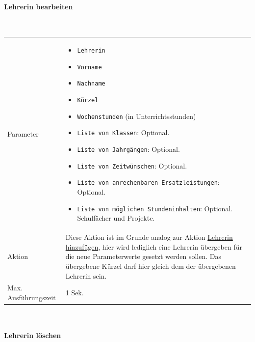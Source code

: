 \documentclass[fontsize=12pt,paper=a4,twoside]{scrartcl}
\begin{document}
\paragraph{Lehrerin bearbeiten}\mbox{}\\

\begin{tabularx}{\textwidth}{p{4cm}X}
Parameter & \begin{itemize}[itemsep=0pt, leftmargin = 0.5cm]
			\item \texttt{Lehrerin}
			\item \texttt{Vorname}
			\item \texttt{Nachname}
			\item \texttt{Kürzel}
			\item \texttt{Wochenstunden} (in Unterrichtsstunden)
			\item \texttt{Liste von Klassen}: Optional. 
			\item \texttt{Liste von Jahrgängen}: Optional. 
			\item \texttt{Liste von Zeitwünschen}: Optional.
			\item \texttt{Liste von anrechenbaren Ersatzleistungen}: Optional.
			\item \texttt{Liste von möglichen Stundeninhalten}: Optional. Schulfächer und Projekte.
			\end{itemize}\\
Aktion & Diese Aktion ist im Grunde analog zur Aktion \hyperlink{par:LehrerinHinzufuegen}{Lehrerin hinzufügen}, hier wird lediglich eine Lehrerin übergeben für die neue Parameterwerte gesetzt werden sollen. Das übergebene Kürzel darf hier gleich dem der übergebenen Lehrerin sein.\\
Max. Ausführungszeit & 1 Sek.
\end{tabularx}\\

\paragraph{Lehrerin löschen}\mbox{}\\
\end{document}
